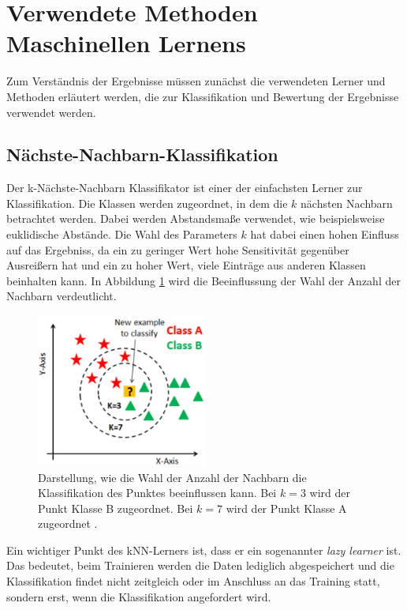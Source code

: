 \section{Verwendete Methoden Maschinellen Lernens}
\label{sec:lerner}
Zum Verständnis der Ergebnisse müssen zunächst die verwendeten
Lerner und Methoden erläutert werden, die zur Klassifikation
und Bewertung der Ergebnisse verwendet werden.

\subsection{Nächste-Nachbarn-Klassifikation}

Der k-Nächste-Nachbarn Klassifikator ist einer der einfachsten Lerner zur
Klassifikation. Die Klassen werden zugeordnet, in dem die $k$ nächsten Nachbarn
betrachtet werden. Dabei werden Abstandsmaße verwendet, wie beispielsweise
euklidische Abstände. Die Wahl des Parameters $k$ hat dabei einen hohen Einfluss
auf das Ergebniss, da ein zu geringer Wert hohe Sensitivität gegenüber Ausreißern
hat und ein zu hoher Wert, viele Einträge aus anderen Klassen beinhalten kann.
In Abbildung \ref{fig:knn} wird die Beeinflussung der Wahl der Anzahl der Nachbarn
verdeutlicht.

\begin{figure}
  \centering
  \includegraphics[width=0.5\textwidth]{plots/knn.pdf}
  \caption{Darstellung, wie die Wahl der Anzahl der Nachbarn die Klassifikation des Punktes
  beeinflussen kann. Bei $k = 3$ wird der Punkt Klasse B zugeordnet. Bei
  $k = 7$ wird der Punkt Klasse A zugeordnet \cite{kNN}.}
  \label{fig:knn}
\end{figure}

Ein
wichtiger Punkt des kNN-Lerners ist, dass er ein sogenannter \textit{lazy learner}
ist. Das bedeutet, beim Trainieren werden die Daten lediglich abgespeichert und
die Klassifikation findet nicht zeitgleich oder im Anschluss an das Training
statt, sondern erst, wenn die Klassifikation angefordert wird.


